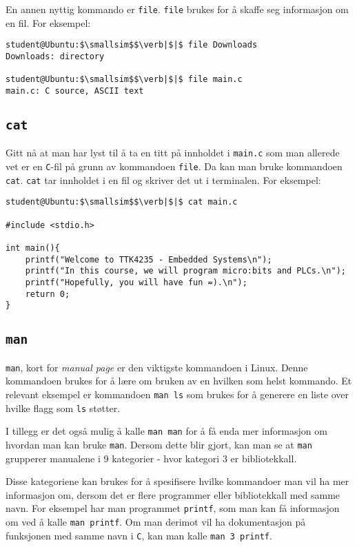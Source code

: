 \begin{alphasection}
En annen nyttig kommando er \verb|file|. \verb|file| brukes for å skaffe seg informasjon om en fil. For eksempel:

\begin{lstlisting}[mathescape=true]
student@Ubuntu:$\smallsim$$\verb|$|$ file Downloads
Downloads: directory

student@Ubuntu:$\smallsim$$\verb|$|$ file main.c
main.c: C source, ASCII text
\end{lstlisting}



\cprotect\subsection{\lstinline{cat}}

Gitt nå at man har lyst til å ta en titt på innholdet i \verb|main.c| som man allerede vet er en \verb|C|-fil på grunn av kommandoen \verb|file|. Da kan man bruke kommandoen \verb|cat|. \verb|cat| tar innholdet i en fil og skriver det ut i terminalen. For eksempel:

\begin{lstlisting}[mathescape=true]
student@Ubuntu:$\smallsim$$\verb|$|$ cat main.c

#include <stdio.h>

int main(){
    printf("Welcome to TTK4235 - Embedded Systems\n");
    printf("In this course, we will program micro:bits and PLCs.\n");
    printf("Hopefully, you will have fun =).\n");
    return 0;
}
\end{lstlisting}


\cprotect\subsection{\lstinline{man}}

\verb|man|, kort for \textit{manual page} er den viktigste kommandoen i Linux. Denne kommandoen brukes for å lære om bruken av en hvilken som helst kommando. Et relevant eksempel er kommandoen \verb|man ls| som brukes for å generere en liste over hvilke flagg som \verb|ls| støtter. 

I tillegg er det også mulig å kalle \verb|man man| for å få enda mer informasjon om hvordan man kan bruke \verb|man|. Dersom dette blir gjort, kan man se at \verb|man| grupperer manualene i 9 kategorier - hvor kategori 3 er bibliotekkall. 

Disse kategoriene kan brukes for å spesifisere hvilke kommandoer man vil ha mer informasjon om, dersom det er flere programmer eller bibliotekkall med samme navn. For eksempel har man programmet \verb|printf|, som  man kan få informasjon om ved å kalle \verb|man printf|. Om man derimot vil ha dokumentasjon på funksjonen med samme navn i \verb|C|, kan man kalle \verb|man 3 printf|.


\end{alphasection}
